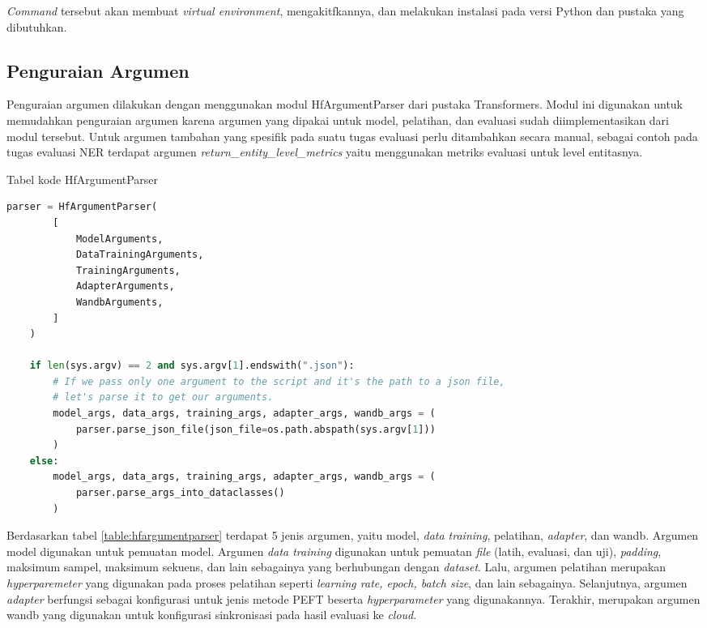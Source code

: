 \textit{Command} tersebut akan membuat \textit{virtual environment}, mengakitfkannya, dan melakukan instalasi pada versi Python dan pustaka yang dibutuhkan.

\subsection{Penguraian Argumen}
\label{sec:parse-arg}

Penguraian argumen dilakukan dengan menggunakan modul HfArgumentParser dari pustaka Transformers. Modul ini digunakan untuk memudahkan penguraian argumen karena argumen yang dipakai untuk model, pelatihan, dan evaluasi sudah diimplementasikan dari modul tersebut. Untuk argumen tambahan yang spesifik pada suatu tugas evaluasi perlu ditambahkan secara manual, sebagai contoh pada tugas evaluasi NER terdapat argumen \textit{return\_entity\_level\_metrics} yaitu menggunakan metriks evaluasi untuk level entitasnya.

\begin{table}
    \caption{Tabel kode HfArgumentParser}
    \label{table:hfargumentparser}
    \begin{lstlisting}[language=python]
    parser = HfArgumentParser(
        [
            ModelArguments,
            DataTrainingArguments,
            TrainingArguments,
            AdapterArguments,
            WandbArguments,
        ]
    )

    if len(sys.argv) == 2 and sys.argv[1].endswith(".json"):
        # If we pass only one argument to the script and it's the path to a json file,
        # let's parse it to get our arguments.
        model_args, data_args, training_args, adapter_args, wandb_args = (
            parser.parse_json_file(json_file=os.path.abspath(sys.argv[1]))
        )
    else:
        model_args, data_args, training_args, adapter_args, wandb_args = (
            parser.parse_args_into_dataclasses()
        )
    \end{lstlisting}
\end{table}

Berdasarkan tabel \ref{table:hfargumentparser} terdapat 5 jenis argumen, yaitu model, \textit{data training}, pelatihan, \textit{adapter}, dan wandb. Argumen model digunakan untuk pemuatan model. Argumen \textit{data training} digunakan untuk pemuatan \textit{file} (latih, evaluasi, dan uji), \textit{padding}, maksimum sampel, maksimum sekuens, dan lain sebagainya yang berhubungan dengan \textit{dataset}. Lalu, argumen pelatihan merupakan \textit{hyperparemeter} yang digunakan pada proses pelatihan seperti \textit{learning rate, epoch, batch size}, dan lain sebagainya. Selanjutnya, argumen \textit{adapter} berfungsi sebagai konfigurasi untuk jenis metode PEFT beserta \textit{hyperparameter} yang digunakannya. Terakhir, merupakan argumen wandb yang digunakan untuk konfigurasi sinkronisasi pada hasil evaluasi ke \textit{cloud}.

